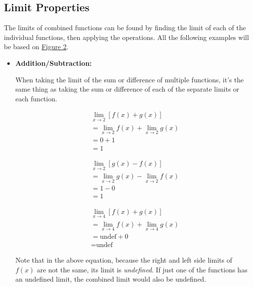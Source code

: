 \documentclass[12pt]{article}
\begin{document}
        \subsection{Limit Properties}
            The limits of combined functions can be found by finding the limit of each of the individual functions, then applying the operations. All the following examples will be based on \hyperref[fig:limasymptote]{Figure 2}.

            \begin{itemize}
                \item \textbf{Addition/Subtraction:}

                    When taking the limit of the sum or difference of multiple functions, it's the same thing as taking the sum or difference of each of the separate limits or each function.

                    \begin{align*}
                        &\lim_{x \to 2} \left[ f(x) + g(x) \right] \\
                        &= \lim_{x \to 2} f(x) + \lim_{x \to 2} g(x) \\
                        &= 0 + 1 \\
                        &= 1
                    \end{align*}

                    \begin{align*}
                        &\lim_{x \to 2} \left[ g(x) - f(x) \right] \\
                        &= \lim_{x \to 2} g(x) - \lim_{x \to 2} f(x) \\
                        &= 1 - 0 \\
                        &= 1
                    \end{align*}

                    \begin{align*}
                        &\lim_{x \to 4} \left[ f(x) + g(x) \right] \\
                        &= \lim_{x \to 4} f(x) + \lim_{x \to 4} g(x) \\
                        &= \text{undef} + 0 \\
                        &= \text{undef}
                    \end{align*}

                    \indent Note that in the above equation, because the right and left side limits of $f(x)$ are not the same, its limit is \textit{undefined}. If just one of the functions has an undefined limit, the combined limit would also be undefined.


\end{itemize}
\end{document}
